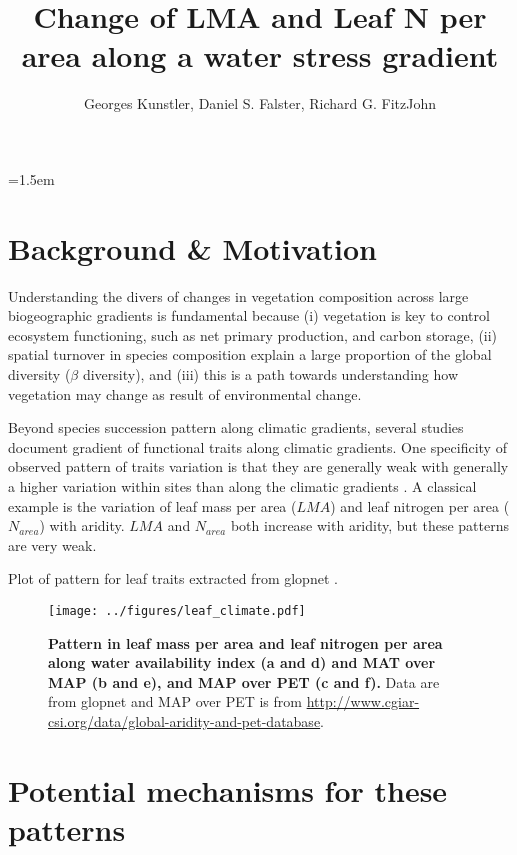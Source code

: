 \documentclass[a4paper,11pt]{article}
\title{Change of LMA and Leaf N per area along a water stress gradient}
\author{Georges Kunstler, Daniel S. Falster, Richard G. FitzJohn}
\date{}
\affiliation{Irstea, Grenoble, France and Department of Biological Sciences, Macquarie University,
  Sydney, Australia}
\date{}
\begin{document}
\mstitleshort
\parindent=1.5em
\addtolength{\parskip}{.3em}


\section{Background \& Motivation}

Understanding the divers of changes in vegetation composition across large biogeographic gradients is fundamental because (i) vegetation is key to control ecosystem functioning, such as net primary production, and carbon storage, (ii) spatial turnover in species composition explain a large proportion of the global diversity ($\beta$ diversity), and (iii) this is a path towards understanding how vegetation may change as result of environmental change.

Beyond species succession pattern along climatic gradients, several
studies document gradient of functional traits along climatic
gradients. One specificity of observed pattern of traits variation is
that they are generally weak with generally a higher variation within
sites than along the climatic gradients \citep[see][]{Wright-2004}. A
classical example is the variation of leaf mass per area ($LMA$) and
leaf nitrogen per area ($N_{area}$) with aridity. $LMA$
\citep{Wright-2004,Onoda-2011,Moles-2014} and $N_{area}$
\citep{Wright-2005,Maire-2015} both increase with aridity, but these
patterns are very weak.


Plot of pattern for leaf traits extracted from glopnet \citep{Wright-2004}.

\begin{figure}[ht]
\centering
\texttt{[image: ../figures/leaf\_climate.pdf]}
\caption{\textbf{Pattern in leaf mass per area and leaf nitrogen per area along water availability index (a and d) and MAT over MAP (b and e), and MAP over PET (c and f).} Data are from glopnet \citep{Wright-2004} and MAP over PET is from \url{http://www.cgiar-csi.org/data/global-aridity-and-pet-database}.
\label{fig:leafpattern}}
\end{figure}

\clearpage

\section{Potential mechanisms for these patterns}
\end{document}
